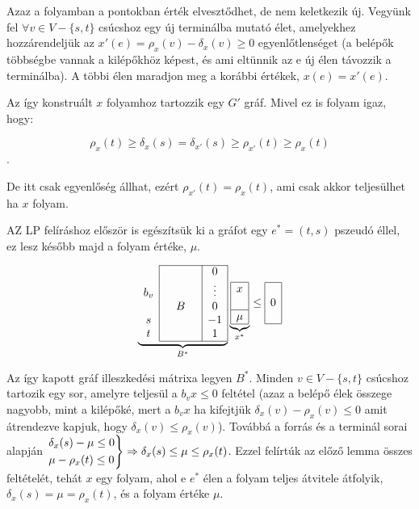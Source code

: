 Azaz a folyamban a pontokban érték elvesztődhet, de nem keletkezik új.
Vegyünk fel $\forall v \in V-\{s,t\}$ csúcshoz egy új terminálba mutató élet,
amelyekhez hozzárendeljük az $x'(e)=\rho_x(v)-\delta_x(v) \geq 0$
egyenlőtlenséget (a belépők többségbe vannak a kilépőkhöz képest, és ami
eltünnik az e új élen távozzik a terminálba). A többi élen maradjon meg a
korábbi értékek, $x(e)=x'(e)$.

Az így konstruált $x$ folyamhoz tartozzik egy $G'$ gráf.  Mivel ez is folyam igaz,
hogy:

\[\rho_{x}(t) \geq \delta_{x}(s) = \delta_{x'}(s) \geq \rho_{x'}(t) \geq 
\rho_{x}(t)\]. 

De itt csak egyenlőség állhat, ezért $\rho_{x'}(t)=\rho_{x}(t)$, ami csak akkor 
teljesülhet ha $x$ folyam.

AZ LP felíráshoz először is egészítsük ki a gráfot egy $e^*=(t,s)$ pszeudó
éllel, ez lesz később majd a folyam értéke, $\mu$.

\begin{wrapfigure}{l}{0.35\textwidth}
\begin{center}
\vspace{-1.3cm}
\begin{displaymath}
\underbrace{
\begin{array}{c|ccc|c|}
\cline{2-5}
&  & & &0 \\
b_v&  & & & \vdots \\
&  & B& & 0\\
s &   & & &-1 \\
t &   & & & 1 \\
\cline{2-5}
\end{array}}_{B^*}
\underbrace{
\begin{array}{|c|}
\hline
x\\
\\
\hline
\mu\\
\hline
\end{array}}_{x^*}
\leq
\begin{array}{|c|}
\hline
\\
0\\
\\
\hline
\end{array}
\end{displaymath}
\vspace{-1.3cm}
\end{center}
\end{wrapfigure}	
Az így kapott gráf illeszkedési mátrixa legyen $B^*$. Minden $v \in V - \{s,t\}$
csúcshoz tartozik egy sor, amelyre teljesül a $b_vx\leq 0$ feltétel (azaz a
belépő élek összege nagyobb, mint a kilépőké, mert a $b_vx$ ha kifejtjük
$\delta_x(v) - \rho_x(v) \leq 0 $ amit átrendezve kapjuk, hogy $ \delta_x(v)
\leq \rho_x(v)$).
Továbbá a forrás és a terminál sorai alapján $\begin{rcases} \delta_x(s)-\mu
\leq 0 \\
\mu - \rho_x(t) \leq 0 \end{rcases} \Rightarrow \delta_x(s) \leq \mu \leq
\rho_x(t)$. Ezzel felírtúk az előző lemma összes feltételét, tehát $x$ egy
folyam, ahol e $e^*$ élen a folyam teljes átvitele átfolyik,
$\delta_x(s)=\mu=\rho_x(t)$, és a folyam értéke $\mu$.

